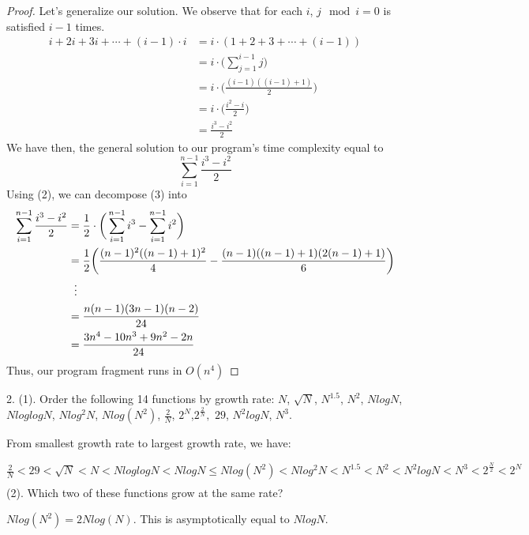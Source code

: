 \documentclass{article}
\begin{document}
\begin{proof}
Let's generalize our solution. We observe that for each $i$, $j \mod i = 0$ is satisfied $i-1$ times.
\begin{align*}
i + 2i + 3i + \cdots + (i -1)\cdot i &= i\cdot(1+2+3+\cdots+(i-1))\\
&= i \cdot \bigg(\sum_{j=1}^{i-1} j\bigg)\\
&= i \cdot \bigg( \frac{(i-1)((i-1)+1)}{2} \bigg)\\
&= i \cdot \bigg( \frac{i^{2} - i}{2} \bigg)\\
&= \frac{i^{3} - i^{2}}{2}
\end{align*}
We have then, the general solution to our program's time complexity equal to
\begin{equation}
\sum_{i=1}^{n-1}\frac{i^{3}-i^{2}}{2}
\end{equation}
Using (2), we can decompose (3) into
\begin{align*}
\sum_{i=1}^{n-1}\frac{i^{3}-i^{2}}{2} &= \frac{1}{2} \cdot \bigg(\sum_{i=1}^{n-1} i^{3} - \sum_{i=1}^{n-1} i^{2} \bigg)\\
&= \frac{1}{2} \bigg( \frac{(n-1)^{2}((n-1)+1)^{2}}{4} - \frac{(n-1)((n-1)+1)(2(n-1)+1)}{6}\bigg) \\
&\hspace{2mm}\vdots \\
&= \frac{n(n-1)(3n-1)(n-2)}{24} \\
&= \frac{3n^{4}-10n^{3}+9n^{2}-2n}{24}
\end{align*}
Thus, our program fragment runs in $O(n^{4})$
\end{proof}
2.
(1).
Order the following 14 functions by growth rate: $N$, $\sqrt{N}$, $N^{1.5}$, $N^{2}$, $NlogN$, $Nlog logN$, $Nlog^{2}N$, 
$Nlog(N^{2})$, $\frac{2}{N}$, $2^{N}$,$2^{\frac{2}{N}},$ $29$, $N^{2}logN$, $N^{3}$.

\vspace{5mm}

From smallest growth rate to largest growth rate, we have:

\vspace{5mm}

$\frac{2}{N} < 29 < \sqrt{N} < N < Nlog logN < NlogN \leq Nlog(N^{2}) < Nlog^{2}N <  N^{1.5} < N^{2} < N^{2}logN < N^{3} < 2^{\frac{N}{2}} < 2^{N}$
\begin{align*}
\end{align*}
(2). Which two of these functions grow at the same rate?

\vspace{5mm}

$Nlog(N^{2}) = 2Nlog(N)$. This is asymptotically equal to $NlogN$.
\end{document}
